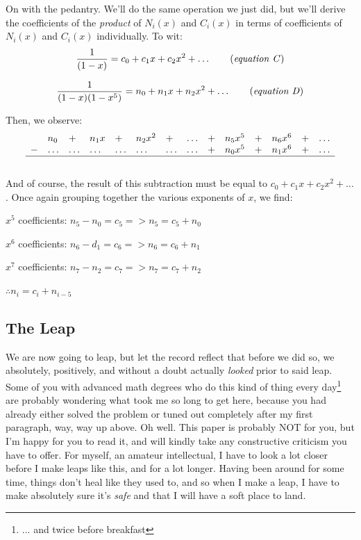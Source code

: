 On with the pedantry.  We'll do the same operation we just did, but we'll derive the coefficients of the \textit{product} of $N_i(x)$ and $C_i(x)$ in terms of coefficients of $N_i(x)$ and $C_i(x)$ individually.  To wit:
\begin{equation}
\displaystyle \frac{1}{(1-x)} = c_0 + c_1x + c_2x^2 + \ldots \\[1.5em]
\tag{\textit{equation C}}
\end{equation}

\begin{equation}
\displaystyle \frac{1}{(1-x)(1-x^5)} = n_0 + n_1x + n_2x^2 + \ldots
\tag{\textit{equation D}}
\end{equation}

\noindent Then, we observe:
\[
\begin{array}{l l l l l l l l l l l l l l }
  & n_0 & + & n_1x & + & n_2x^2 & + & \ldots & + & n_5x^5 & + & n_6x^6 & + & \ldots \\
- & \ldots & \ldots & \ldots & \ldots & \ldots & \ldots & \ldots & + & n_0x^5 & + & n_1x^6 & + & \ldots \\
\hline
\end{array}
\]
\\
\noindent And of course, the result of this subtraction must be equal to $c_0 + c_1x + c_2x^2 + \ldots$.  Once again grouping together the various exponents of $x$, we find:
\begin{center}
$x^5$ coefficients: $n_5 - n_0 = c_5 => n_5 = c_5 + n_0$

$x^6$ coefficients: $n_6 - d_1 = c_6 => n_6 = c_6 + n_1$

$x^7$ coefficients: $n_7 - n_2 = c_7 => n_7 = c_7 + n_2$

$\therefore n_i = c_i + n_{i-5}$
\end{center}

\subsection{The Leap}
We are now going to leap, but let the record reflect that before we did so, we absolutely, positively, and without a doubt actually \textit{looked} prior to said leap.  Some of you with advanced math degrees who do this kind of thing every day\footnote{... and twice before breakfast} are probably wondering what took me so long to get here, because you had already either solved the problem or tuned out completely after my first paragraph, way, way up above.  Oh well.  This paper is probably NOT for you, but I'm happy for you to read it, and will kindly take any constructive criticism you have to offer.  For myself, an amateur intellectual, I have to look a lot closer before I make leaps like this, and for a lot longer.  Having been around for some time, things don't heal like they used to, and so when I make a leap, I have to make absolutely sure it's \textit{safe} and that I will have a soft place to land.  


